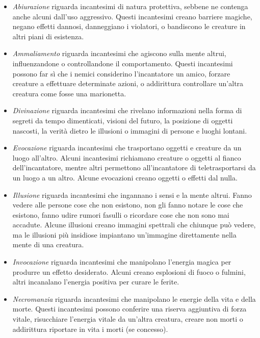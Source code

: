 \begin{itemize}
\item
\textit{Abiurazione} riguarda incantesimi di natura protettiva, sebbene  ne contenga anche alcuni dall'uso aggressivo. Questi incantesimi  creano barriere magiche, negano effetti dannosi, danneggiano i  violatori, o bandiscono le creature in altri piani di esistenza.\\
\item
\textit{Ammaliamento} riguarda incantesimi che agiscono sulla mente altrui, influenzandone o controllandone il comportamento. Questi incantesimi possono far sì che i nemici considerino l’incantatore  un amico, forzare creature a effettuare determinate azioni, o  addirittura controllare un'altra creatura come fosse una marionetta.\\
\item
\textit{Divinazione} riguarda incantesimi che rivelano informazioni nella forma di segreti da tempo dimenticati, visioni del futuro, la  posizione di oggetti nascosti, la verità dietro le illusioni o  immagini di persone e luoghi lontani.\\
\item
\textit{Evocazione} riguarda incantesimi che trasportano oggetti e  creature da un luogo all'altro. Alcuni incantesimi richiamano  creature o oggetti al fianco dell'incantatore, mentre altri  permettono all'incantatore di teletrasportarsi da un luogo a un altro. Alcune evocazioni creano oggetti o effetti dal nulla. \\
\item
\textit{Illusione} riguarda incantesimi che ingannano i sensi e la mente  altrui. Fanno vedere alle persone cose che non esistono, non gli  fanno notare le cose che esistono, fanno udire rumori fasulli o  ricordare cose che non sono mai accadute. Alcune illusioni  creano immagini spettrali che chiunque può vedere, ma le  illusioni più insidiose impiantano un'immagine direttamente nella mente di una creatura.\\
\item
\textit{Invocazione} riguarda incantesimi che manipolano l’energia  magica per produrre un effetto desiderato. Alcuni creano  esplosioni di fuoco o fulmini, altri incanalano l’energia positiva  per curare le ferite.\\
\item
\textit{Necromanzia} riguarda incantesimi che manipolano le energie della vita e della morte. Questi incantesimi possono conferire una riserva aggiuntiva di forza vitale, risucchiare l’energia vitale da un'altra creatura, creare non morti o addirittura riportare in vita i morti (se concesso).\\

\end{itemize}

